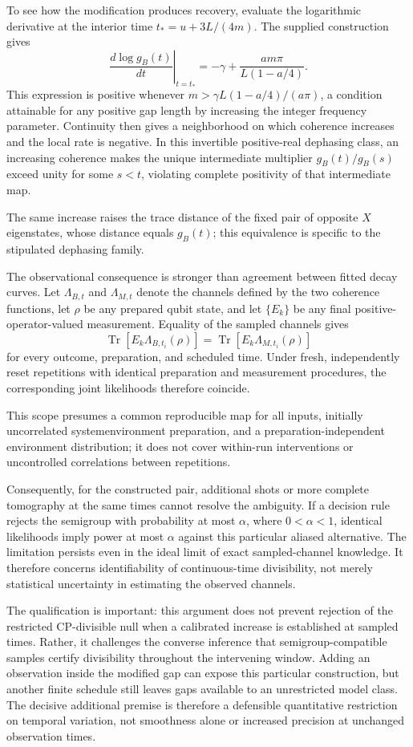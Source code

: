 \documentclass[11pt]{article}
\begin{document}
To see how the modification produces recovery, evaluate the logarithmic derivative at the interior time $t_*=u+3L/(4m)$. The supplied construction gives \[\left.\frac{d\log g_B(t)}{dt}\right|_{t=t_*}=-\gamma+\frac{am\pi}{L(1-a/4)}.\] This expression is positive whenever $m>\gamma L(1-a/4)/(a\pi)$, a condition attainable for any positive gap length by increasing the integer frequency parameter. Continuity then gives a neighborhood on which coherence increases and the local rate is negative. In this invertible positive-real dephasing class, an increasing coherence makes the unique intermediate multiplier $g_B(t)/g_B(s)$ exceed unity for some $s<t$, violating complete positivity of that intermediate map.

The same increase raises the trace distance of the fixed pair of opposite $X$ eigenstates, whose distance equals $g_B(t)$; this equivalence is specific to the stipulated dephasing family.

The observational consequence is stronger than agreement between fitted decay curves. Let $\Lambda_{B,t}$ and $\Lambda_{M,t}$ denote the channels defined by the two coherence functions, let $\rho$ be any prepared qubit state, and let $\{E_k\}$ be any final positive-operator-valued measurement. Equality of the sampled channels gives \[\operatorname{Tr}[E_k\Lambda_{B,t_i}(\rho)]=\operatorname{Tr}[E_k\Lambda_{M,t_i}(\rho)]\] for every outcome, preparation, and scheduled time. Under fresh, independently reset repetitions with identical preparation and measurement procedures, the corresponding joint likelihoods therefore coincide.

This scope presumes a common reproducible map for all inputs, initially uncorrelated system\textendash{}\allowbreak{}environment preparation, and a preparation-independent environment distribution; it does not cover within-run interventions or uncontrolled correlations between repetitions.

Consequently, for the constructed pair, additional shots or more complete tomography at the same times cannot resolve the ambiguity. If a decision rule rejects the semigroup with probability at most $\alpha$, where $0<\alpha<1$, identical likelihoods imply power at most $\alpha$ against this particular aliased alternative. The limitation persists even in the ideal limit of exact sampled-channel knowledge. It therefore concerns identifiability of continuous-time divisibility, not merely statistical uncertainty in estimating the observed channels.

The qualification is important: this argument does not prevent rejection of the restricted CP-divisible null when a calibrated increase is established at sampled times. Rather, it challenges the converse inference that semigroup-compatible samples certify divisibility throughout the intervening window. Adding an observation inside the modified gap can expose this particular construction, but another finite schedule still leaves gaps available to an unrestricted model class. The decisive additional premise is therefore a defensible quantitative restriction on temporal variation, not smoothness alone or increased precision at unchanged observation times.
\end{document}
